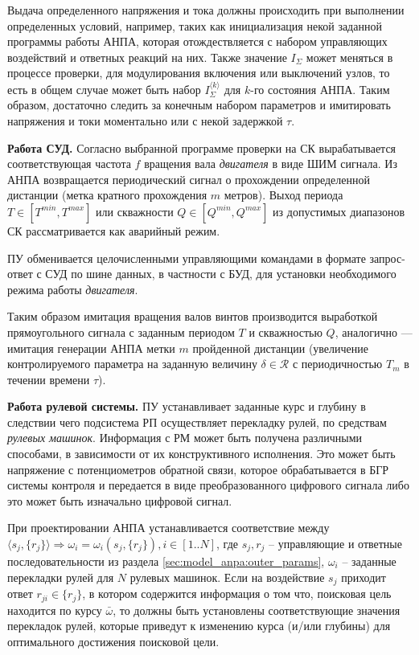 Выдача определенного напряжения и тока должны происходить при выполнении определенных условий,
например, таких как инициализация некой заданной программы работы АНПА, которая
отождествляется с набором управляющих воздействий и ответных реакций на них.
Также значение $I_\Sigma$ может меняться в процессе проверки, для модулирования включения или выключений узлов,
то есть в общем случае может быть набор $I_\Sigma^{\langle k \rangle}$ для $k$-го состояния АНПА.
Таким образом, достаточно следить за конечным набором параметров и
имитировать напряжения и токи моментально или с некой задержкой $\tau$.

\textbf{Работа СУД.}
Согласно выбранной программе проверки на СК вырабатывается соответствующая 
частота $f$ вращения вала \textit{двигателя} в виде ШИМ сигнала.
Из АНПА возвращается периодический сигнал о прохождении определенной дистанции (метка кратного прохождения $m$ метров).
Выход периода $T \in [T^{min}, T^{max}]$ или скважности $Q \in [Q^{min}, Q^{max}]$ из допустимых диапазонов
СК рассматривается как аварийный режим.

ПУ обменивается целочисленными управляющими командами в формате запрос-ответ с СУД по шине данных, в частности с БУД,
для установки необходимого режима работы \textit{двигателя}.

Таким образом имитация вращения валов винтов производится выработкой прямоугольного сигнала с заданным периодом $T$ и скважностью $Q$,
аналогично --- имитация генерации АНПА метки $m$ пройденной дистанции
(увеличение контролируемого параметра на заданную величину $\delta \in \mathcal{R}$ с периодичностью $T_m$ в течении времени $\tau$).

\textbf{Работа рулевой системы.}
ПУ устанавливает заданные курс и глубину в следствии чего подсистема РП
осуществляет перекладку рулей, по средствам \textit{рулевых машинок}.
Информация с РМ может быть получена различными способами, в зависимости от их конструктивного исполнения.
Это может быть напряжение с потенциометров обратной связи, которое обрабатывается в БГР системы контроля
и передается в виде преобразованного цифрового сигнала
либо это может быть изначально  цифровой сигнал.

При проектировании АНПА устанавливается соответствие между $\langle s_j, \{r_j\} \rangle \Rightarrow \omega_i = \omega_i(s_j, \{r_j\}), i\in [1..N]$,
где $s_j, r_j$ -- управляющие и ответные последовательности из раздела \ref{sec:model_anpa:outer_params},
$\omega_i$ -- заданные перекладки рулей для $N$ рулевых машинок.
Если на воздействие $s_j$ приходит ответ $r_{ji} \in \{r_j\}$, в котором содержится информация о том что,
поисковая цель находится по курсу $\bar \omega$, то должны быть установлены соответствующие значения перекладок рулей,
которые приведут к изменению курса (и/или глубины) для оптимального достижения поисковой цели.



